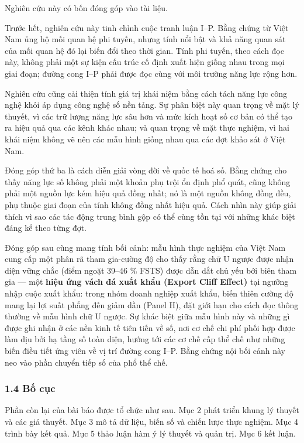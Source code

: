\documentclass[12pt,a4paper]{article}
\begin{document}
Nghiên cứu này có bốn đóng góp vào tài liệu.

Trước hết, nghiên cứu này tinh chỉnh cuộc tranh luận I--P. Bằng chứng từ
Việt Nam ủng hộ mối quan hệ phi tuyến, nhưng tính nổi bật và khả năng
quan sát của mối quan hệ đó lại biến đổi theo thời gian. Tính phi tuyến,
theo cách đọc này, không phải một sự kiện cấu trúc cố định xuất hiện
giống nhau trong mọi giai đoạn; đường cong I--P phải được đọc cùng với
môi trường năng lực rộng hơn.

Nghiên cứu cũng cải thiện tính giá trị khái niệm bằng cách tách năng lực
công nghệ khỏi áp dụng công nghệ số nền tảng. Sự phân biệt này quan
trọng về mặt lý thuyết, vì các trữ lượng năng lực sâu hơn và mức kích
hoạt số cơ bản có thể tạo ra hiệu quả qua các kênh khác nhau; và quan
trọng về mặt thực nghiệm, vì hai khái niệm không vẽ nên các mẫu hình
giống nhau qua các đợt khảo sát ở Việt Nam.

Đóng góp thứ ba là cách diễn giải vòng đời về quốc tế hoá số. Bằng chứng
cho thấy năng lực số không phải một khoản phụ trội ổn định phổ quát,
cũng không phải một nguồn lực kém hiệu quả đồng nhất; nó là một nguồn
không đồng đều, phụ thuộc giai đoạn của tính không đồng nhất hiệu quả.
Cách nhìn này giúp giải thích vì sao các tác động trung bình gộp có thể
cùng tồn tại với những khác biệt đáng kể theo từng đợt.

Đóng góp sau cùng mang tính bối cảnh: mẫu hình thực nghiệm của Việt Nam
cung cấp một phân rã tham gia-cường độ cho thấy rằng chữ U ngược được
nhận diện vững chắc (điểm ngoặt 39--46 \% FSTS) được dẫn dắt chủ yếu bởi
biên tham gia --- một \textbf{hiệu ứng vách đá xuất khẩu (Export Cliff
Effect)} tại ngưỡng nhập cuộc xuất khẩu: trong nhóm doanh nghiệp xuất
khẩu, biến thiên cường độ mang lại lợi suất phẳng đến giảm dần (Panel
H), đặt giới hạn cho cách đọc thông thường về mẫu hình chữ U ngược. Sự
khác biệt giữa mẫu hình này và những gì được ghi nhận ở các nền kinh tế
tiên tiến về số, nơi cơ chế chi phí phối hợp được làm dịu bởi hạ tầng số
toàn diện, hướng tới các cơ chế cấp thể chế như những biến điều tiết ứng
viên về vị trí đường cong I--P. Bằng chứng nội bối cảnh này neo vào phần
chuyển tiếp số của phổ thể chế.

\hypertarget{14-bux1ed1-cux1ee5c}{%
\subsubsection{1.4 Bố cục}\label{14-bux1ed1-cux1ee5c}}

Phần còn lại của bài báo được tổ chức như sau. Mục 2 phát triển khung lý
thuyết và các giả thuyết. Mục 3 mô tả dữ liệu, biến số và chiến lược
thực nghiệm. Mục 4 trình bày kết quả. Mục 5 thảo luận hàm ý lý thuyết và
quản trị. Mục 6 kết luận.
\end{document}

